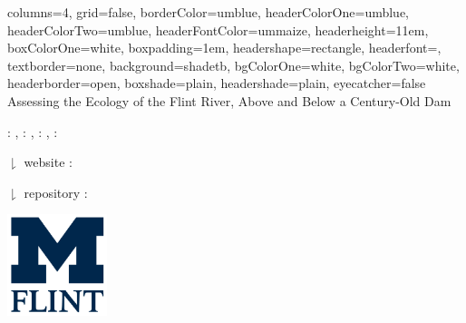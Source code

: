 \documentclass[b0paper,margin=1cm,landscape]{baposter}
\begin{document}

\begin{poster}{
  columns=4,
	grid=false,
	borderColor=umblue,
	headerColorOne=umblue,
	headerColorTwo=umblue,
	headerFontColor=ummaize,
  headerheight=11em,
	boxColorOne=white,
  boxpadding=1em,
	headershape=rectangle,
	headerfont=\Large\textsf,
	textborder=none,
	background=shadetb,
  bgColorOne=white,
  bgColorTwo=white,
	headerborder=open,
  boxshade=plain,
  headershade=plain,
  eyecatcher=false
}
{
}
{Assessing the Ecology of the Flint River, Above and Below a Century-Old Dam}
{
  \vspace{0mm}
   : \textit{\color{violet}{summersj@umich.edu}}, 
   : \textit{\color{violet}{arelkins@umich.edu}}, 
   : \textit{\color{violet}{casonk@umich.edu}}, 
   : \textit{\color{violet}{hdawson@umich.edu}} 
  
  \hspace{1mm} $\downharpoonright$ website : \textit{\color{violet}{https://flintriverecostudy.com}}

  \hspace{1mm} $\downharpoonright$ repository : \textit{\color{violet}{https://github.com/casonk/Flint\_River\_Ecology}}

}
{
  \begin{minipage}{9.0em}
    \includegraphics[height=8em]{Img/University_of_Michigan_Flint.png}
  \end{minipage}
}

\end{poster}
\end{document}
